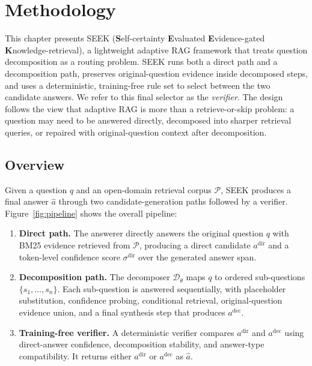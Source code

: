 \chapter{Methodology}
\label{ch:method}

This chapter presents SEEK (\textbf{S}elf-certainty \textbf{E}valuated \textbf{E}vidence-gated \textbf{K}nowledge-retrieval), a lightweight adaptive RAG framework that treats question decomposition as a routing problem. SEEK runs both a direct path and a decomposition path, preserves original-question evidence inside decomposed steps, and uses a deterministic, training-free rule set to select between the two candidate answers. We refer to this final selector as the \emph{verifier}. The design follows the view that adaptive RAG is more than a retrieve-or-skip problem: a question may need to be answered directly, decomposed into sharper retrieval queries, or repaired with original-question context after decomposition.

\section{Overview}
\label{sec:overview}

Given a question $q$ and an open-domain retrieval corpus $\mathcal{P}$, SEEK produces a final answer $\hat{a}$ through two candidate-generation paths followed by a verifier. Figure~\ref{fig:pipeline} shows the overall pipeline:

\begin{enumerate}
    \item \textbf{Direct path.} The answerer directly answers the original question $q$ with BM25 evidence retrieved from $\mathcal{P}$, producing a direct candidate $a^{\mathrm{dir}}$ and a token-level confidence score $\sigma^{\mathrm{dir}}$ over the generated answer span.
    \item \textbf{Decomposition path.} The decomposer $\mathcal{D}_\theta$ maps $q$ to ordered sub-questions $\{s_1, \ldots, s_n\}$. Each sub-question is answered sequentially, with placeholder substitution, confidence probing, conditional retrieval, original-question evidence union, and a final synthesis step that produces $a^{\mathrm{dec}}$.
    \item \textbf{Training-free verifier.} A deterministic verifier compares $a^{\mathrm{dir}}$ and $a^{\mathrm{dec}}$ using direct-answer confidence, decomposition stability, and answer-type compatibility. It returns either $a^{\mathrm{dir}}$ or $a^{\mathrm{dec}}$ as $\hat{a}$.
\end{enumerate}

